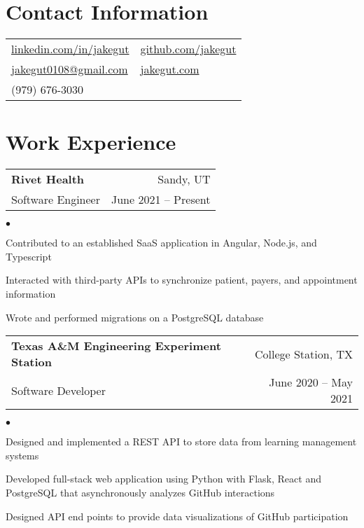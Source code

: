 \documentclass[margin, line]{res}
\makeatletter
\newcommand{\li}{https://linkedin.com/in/jakegut}
\newcommand{\gh}{https://github.com/jakegut}
\newcommand{\personalsite}{https://jakegut.com}
\newcommand{\resumeSubheading}[4]{

\begin{tabular*}{1.01\textwidth}{@{\hspace{-4pt}}l @{\extracolsep{\fill}} r}
\textbf{#1} & #2 \\
      #3 &  #4 
\end{tabular*}\vspace{-2pt}
}
\newenvironment{list2}{
	\begin{list}{$\bullet$}{%
		\setlength{\itemsep}{0in}
		\setlength{\parsep}{0in} \setlength{\parskip}{0in}
		\setlength{\topsep}{0in} \setlength{\partopsep}{0in}
		\setlength{\leftmargin}{0.2in}}}{\end{list}}
\makeatother
\begin{document}
\name{
    \vspace*{-.5in}
	{\huge Jake Gutierrez}
	\hspace*{.1in}
	\vspace*{.1in}
	}

\begin{resume}
\section{\sc Contact Information}
\vspace{.05in}
\begin{tabular}{@{}p{3.17in}p{4in}}
	\href{\li}{linkedin.com/in/jakegut} & \href{\gh}{github.com/jakegut}\\
    \href{mailto:jakegut0108@gmail.com}{jakegut0108@gmail.com} & \href{\personalsite}{jakegut.com}\\
     (979) 676-3030
\end{tabular}

\section{\sc Work Experience}

\vspace{2pt}
                 
\resumeSubheading{{\bf Rivet Health}}{Sandy, UT}
                 {Software Engineer}{June 2021 -- Present}
                 
\begin{list2}
\item{Contributed to an established SaaS application in Angular, Node.js, and Typescript}
\item{Interacted with third-party APIs to synchronize patient, payers, and appointment information}
\item{Wrote and performed migrations on a PostgreSQL database}
\end{list2}

\resumeSubheading{{\bf Texas A\&M Engineering Experiment Station}}{College Station, TX}
                 {Software Developer}{June 2020 -- May 2021}

\begin{list2}
\item{Designed and implemented a REST API to store data from learning management systems }
\item{Developed full-stack web application using Python with Flask, React and PostgreSQL that asynchronously analyzes GitHub interactions }
\item{Designed API end points to provide data visualizations of GitHub participation }
\end{list2}


\end{resume}
\end{document}
